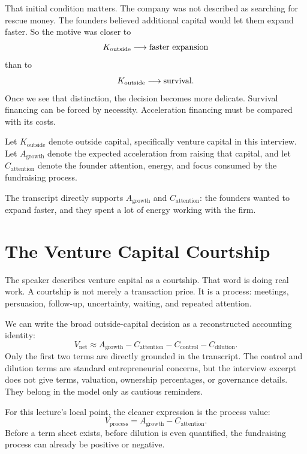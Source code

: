 That initial condition matters. The company was not described as searching for rescue money. The founders believed additional capital would let them expand faster. So the motive was closer to
\begin{equation}
K_{\mathrm{outside}} \longrightarrow \hbox{faster expansion}
\end{equation}
than to
\begin{equation}
K_{\mathrm{outside}} \longrightarrow \hbox{survival}.
\end{equation}
Once we see that distinction, the decision becomes more delicate. Survival financing can be forced by necessity. Acceleration financing must be compared with its costs.

\begin{definition}
Let \(K_{\mathrm{outside}}\) denote outside capital, specifically venture capital in this interview. Let \(A_{\mathrm{growth}}\) denote the expected acceleration from raising that capital, and let \(C_{\mathrm{attention}}\) denote the founder attention, energy, and focus consumed by the fundraising process.
\end{definition}

The transcript directly supports \(A_{\mathrm{growth}}\) and \(C_{\mathrm{attention}}\): the founders wanted to expand faster, and they spent a lot of energy working with the firm.

\section{The Venture Capital Courtship}

The speaker describes venture capital as a courtship. That word is doing real work. A courtship is not merely a transaction price. It is a process: meetings, persuasion, follow-up, uncertainty, waiting, and repeated attention.

We can write the broad outside-capital decision as a reconstructed accounting identity:
\begin{equation}
V_{\mathrm{net}}
\approx
A_{\mathrm{growth}}
-
C_{\mathrm{attention}}
-
C_{\mathrm{control}}
-
C_{\mathrm{dilution}} .
\end{equation}
Only the first two terms are directly grounded in the transcript. The control and dilution terms are standard entrepreneurial concerns, but the interview excerpt does not give terms, valuation, ownership percentages, or governance details. They belong in the model only as cautious reminders.

For this lecture's local point, the cleaner expression is the process value:
\begin{equation}
V_{\mathrm{process}}
=
A_{\mathrm{growth}}
-
C_{\mathrm{attention}} .
\end{equation}
Before a term sheet exists, before dilution is even quantified, the fundraising process can already be positive or negative.

